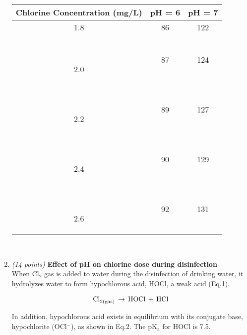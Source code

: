 \documentclass[12pt,letterpaper]{article}
\begin{document}
\begin{enumerate}
\vspace{0.3in}

\begin{minipage}{\linewidth}
\centering
{} \label{tab:title}


\begin{tabular}{|c|c|c|}\toprule[1.25pt]
\bf Chlorine Concentration (mg/L)	& \bf pH = 6 	& \bf pH = 7	\\\midrule
1.8	& 86 & 122 \\ \hline\

2.0	& 87 & 124 \\ \hline\

2.2	& 89 & 127 \\ \hline\

2.4	& 90 & 129 \\ \hline\

2.6	& 92 & 131 \\ 


\bottomrule[1.25pt]

\end {tabular}\par
\end{minipage}\\

\vspace{0.3in}


\item \emph{(14 points)} \textbf{Effect of pH on chlorine dose during disinfection}\\
When Cl$_2$ gas is added to water during the disinfection of drinking water, it hydrolyzes water to form hypochlorous acid, HOCl, a weak acid (Eq.1). 

\begin{align}
\cee{Cl_{2(gas)}\,  \rightarrow \, HOCl \, + \,  HCl}
\end{align}


In addition, hypochlorous acid exists in equilibrium with its conjugate base, hypochlorite (OCl$^-$), as shown in Eq.2. The pK$\mathrm{_a}$ for HOCl is 7.5. 


\end{enumerate}
\end{document}

